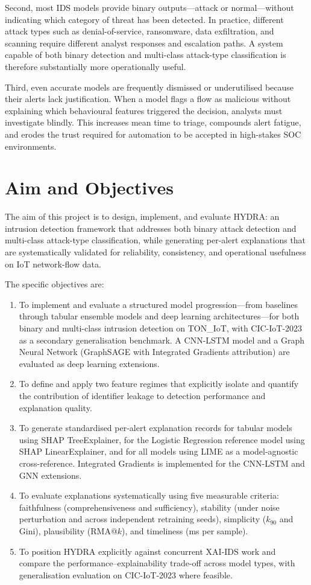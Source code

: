 \documentclass[12pt,a4paper]{report}
\begin{document}
Second, most IDS models provide binary outputs---attack or normal---without indicating which category of threat has been detected. In practice, different attack types such as denial-of-service, ransomware, data exfiltration, and scanning require different analyst responses and escalation paths. A system capable of both binary detection and multi-class attack-type classification is therefore substantially more operationally useful.

Third, even accurate models are frequently dismissed or underutilised because their alerts lack justification. When a model flags a flow as malicious without explaining which behavioural features triggered the decision, analysts must investigate blindly. This increases mean time to triage, compounds alert fatigue, and erodes the trust required for automation to be accepted in high-stakes SOC environments.

\section{Aim and Objectives}
\label{sec:aim}

The aim of this project is to design, implement, and evaluate HYDRA: an intrusion detection framework that addresses both binary attack detection and multi-class attack-type classification, while generating per-alert explanations that are systematically validated for reliability, consistency, and operational usefulness on IoT network-flow data.

The specific objectives are:
\begin{enumerate}
  \item To implement and evaluate a structured model progression---from baselines through tabular ensemble models and deep learning architectures---for both binary and multi-class intrusion detection on TON\_IoT, with CIC-IoT-2023 as a secondary generalisation benchmark. A CNN-LSTM model and a Graph Neural Network (GraphSAGE with Integrated Gradients attribution) are evaluated as deep learning extensions.
  \item To define and apply two feature regimes that explicitly isolate and quantify the contribution of identifier leakage to detection performance and explanation quality.
  \item To generate standardised per-alert explanation records for tabular models using SHAP TreeExplainer, for the Logistic Regression reference model using SHAP LinearExplainer, and for all models using LIME as a model-agnostic cross-reference. Integrated Gradients is implemented for the CNN-LSTM and GNN extensions.
  \item To evaluate explanations systematically using five measurable criteria: faithfulness (comprehensiveness and sufficiency), stability (under noise perturbation and across independent retraining seeds), simplicity ($k_{90}$ and Gini), plausibility (RMA@$k$), and timeliness (ms per sample).
  \item To position HYDRA explicitly against concurrent XAI-IDS work and compare the performance--explainability trade-off across model types, with generalisation evaluation on CIC-IoT-2023 where feasible.
\end{enumerate}
\end{document}
